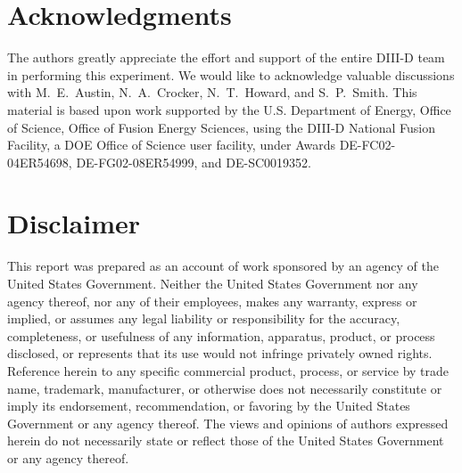 \documentclass[english,aip,pop,superscriptaddress,preprint,letterpaper]{revtex4-2}
\begin{document}
\section*{Acknowledgments}

The authors greatly appreciate the effort and support of the entire DIII-D team in performing this experiment. 
We would like to acknowledge valuable discussions with M.~E.~Austin, N.~A.~Crocker, N.~T.~Howard, and S.~P.~Smith.
This material is based upon work supported by the U.S. Department of Energy, Office of Science, Office of Fusion Energy Sciences, using the DIII-D National Fusion Facility, a DOE Office of Science user facility, under Awards DE-FC02-04ER54698, DE-FG02-08ER54999, and DE-SC0019352. 

\section*{Disclaimer}
This report was prepared as an account of work sponsored by an agency of the United States Government. 
Neither the United States Government nor any agency thereof, nor any of their employees, makes any warranty, express or implied, or assumes any legal liability or responsibility for the accuracy, completeness, or usefulness of any information, apparatus, product, or process disclosed, or represents that its use would not infringe privately owned rights. 
Reference herein to any specific commercial product, process, or service by trade name, trademark, manufacturer, or otherwise does not necessarily constitute or imply its endorsement, recommendation, or favoring by the United States Government or any agency thereof.
The views and opinions of authors expressed herein do not necessarily state or reflect those of the United States Government or any agency thereof.




\end{document}
